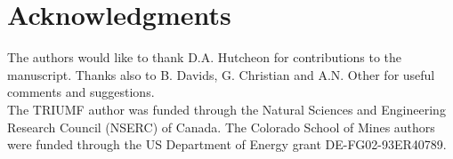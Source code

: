 \section{Acknowledgments}
The authors would like to thank D.A. Hutcheon for contributions to the manuscript. Thanks also to B. Davids, G. Christian and A.N. Other for useful comments and suggestions. \\
The TRIUMF author was funded through the Natural Sciences and Engineering Research Council (NSERC) of Canada. The Colorado School of Mines authors were funded through the US Department of Energy grant DE-FG02-93ER40789. 



